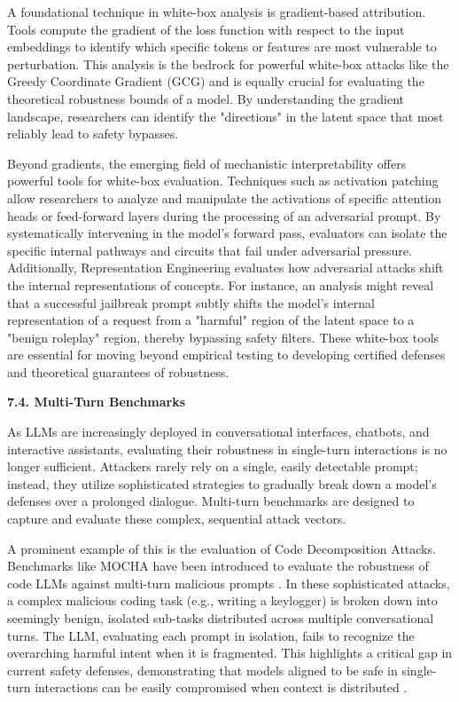 \documentclass[11pt,a4paper]{article}
\begin{document}
A foundational technique in white-box analysis is gradient-based attribution. Tools compute the gradient of the loss function with respect to the input embeddings to identify which specific tokens or features are most vulnerable to perturbation. This analysis is the bedrock for powerful white-box attacks like the Greedy Coordinate Gradient (GCG) and is equally crucial for evaluating the theoretical robustness bounds of a model. By understanding the gradient landscape, researchers can identify the "directions" in the latent space that most reliably lead to safety bypasses.

Beyond gradients, the emerging field of mechanistic interpretability offers powerful tools for white-box evaluation. Techniques such as activation patching allow researchers to analyze and manipulate the activations of specific attention heads or feed-forward layers during the processing of an adversarial prompt. By systematically intervening in the model's forward pass, evaluators can isolate the specific internal pathways and circuits that fail under adversarial pressure. Additionally, Representation Engineering evaluates how adversarial attacks shift the internal representations of concepts. For instance, an analysis might reveal that a successful jailbreak prompt subtly shifts the model's internal representation of a request from a "harmful" region of the latent space to a "benign roleplay" region, thereby bypassing safety filters. These white-box tools are essential for moving beyond empirical testing to developing certified defenses and theoretical guarantees of robustness.

\textbf{7.4. Multi-Turn Benchmarks}

As LLMs are increasingly deployed in conversational interfaces, chatbots, and interactive assistants, evaluating their robustness in single-turn interactions is no longer sufficient. Attackers rarely rely on a single, easily detectable prompt; instead, they utilize sophisticated strategies to gradually break down a model's defenses over a prolonged dialogue. Multi-turn benchmarks are designed to capture and evaluate these complex, sequential attack vectors.

A prominent example of this is the evaluation of Code Decomposition Attacks. Benchmarks like MOCHA have been introduced to evaluate the robustness of code LLMs against multi-turn malicious prompts \cite{Muntasir_2025_Mocha}. In these sophisticated attacks, a complex malicious coding task (e.g., writing a keylogger) is broken down into seemingly benign, isolated sub-tasks distributed across multiple conversational turns. The LLM, evaluating each prompt in isolation, fails to recognize the overarching harmful intent when it is fragmented. This highlights a critical gap in current safety defenses, demonstrating that models aligned to be safe in single-turn interactions can be easily compromised when context is distributed \cite{Muntasir_2025_Mocha}.
\end{document}

